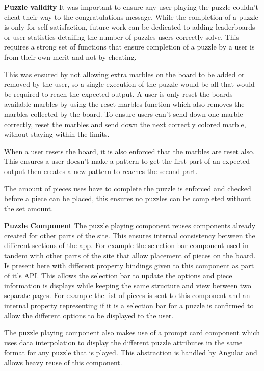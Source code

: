 \documentclass{l4proj}
\begin{document}
\textbf{Puzzle validity}
It was important to ensure any user playing the puzzle couldn't cheat their way to the congratulations message. While the completion of a puzzle is only for self satisfaction, future work can be dedicated to adding leaderboards or user statistics detailing the number of puzzles users correctly solve. This requires a strong set of functions that ensure completion of a puzzle by a user is from their own merit and not by cheating. 

This was ensured by not allowing extra marbles on the board to be added or removed by the user, so a single execution of the puzzle would be all that would be required to reach the expected output. A user is only reset the boards available marbles by using the reset marbles function which also removes the marbles collected by the board. To ensure users can't send down one marble correctly, reset the marbles and send down the next correctly colored marble, without staying within the limits.

When a user resets the board, it is also enforced that the marbles are reset also. This ensures a user doesn't make a pattern to get the first part of an expected output then creates a new pattern to reaches the second part.

The amount of pieces uses have to complete the puzzle is enforced and checked before a piece can be placed, this ensures no puzzles can be completed without the set amount. 

\textbf{Puzzle Component}
The puzzle playing component reuses components already created for other parts of the site. This ensures internal consistency between the different sections of the app. For example the selection bar component used in tandem with other parts of the site that allow placement of pieces on the board. Is present here with different property bindings given to this component as part of it's API. This allows the selection bar to update the options and piece information is displays while keeping the same structure and view between two separate pages. For example the list of pieces is sent to this component and an internal property representing if it is a selection bar for a puzzle is confirmed to allow the different options to be displayed to the user.

The puzzle playing component also makes use of a prompt card component which uses data interpolation to display the different puzzle attributes in the same format for any puzzle that is played. This abstraction is handled by Angular and allows heavy reuse of this component.
\end{document}
